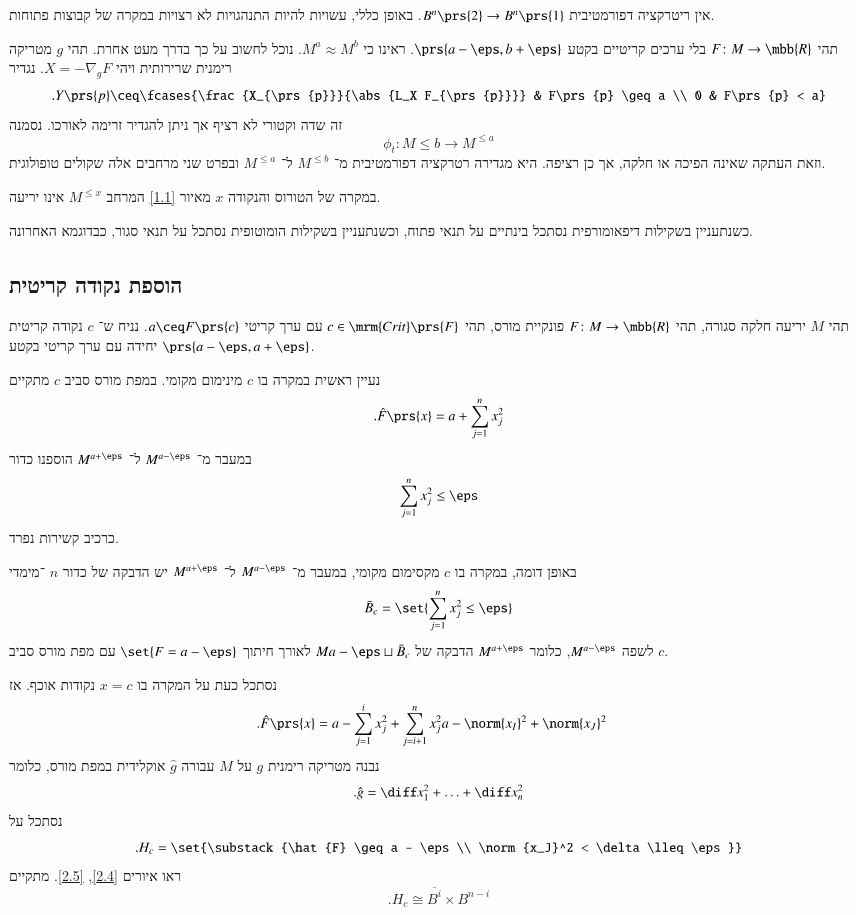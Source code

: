 \documentclass[a4paper,10pt,twoside,openany]{book}
\begin{document}
\begin{example}
אין ריטרקציה דפורמטיבית
$B^n\prs{2} \to B^n\prs{1}$.
באופן כללי, עשויות להיות התנהגויות לא רצויות במקרה של קבוצות פתוחות.
\end{example}

\begin{example}
תהי
$F \colon M \to \mbb{R}$
בלי ערכים קריטיים בקטע
$\prs{a-\eps, b+\eps}$.
ראינו כי
$M^a \approx M^b$.
נוכל לחשוב על כך בדרך מעט אחרת.
תהי
$g$
מטריקה רימנית שרירותית ויהי
$X = -\nabla_g F$.
נגדיר
\[\text{.} Y\prs{p} \ceq \fcases{\frac{X_{\prs{p}}}{\abs{L_X F_{\prs{p}}}} & F\prs{p} \geq a \\ 0 & F\prs{p} < a}\]
זה שדה וקטורי לא רציף אך ניתן להגדיר זרימה לאורכו.
נסמנה
\[\phi_t \colon M{\leq b} \to M^{\leq a}\]
וזאת העתקה שאינה הפיכה או חלקה, אך כן רציפה.
היא מגדירה רטרקציה דפורמטיבית מ־%
$M^{\leq b}$
ל־%
$M^{\leq a}$
ובפרט שני מרחבים אלה שקולים טופולוגית.
\end{example}

\begin{remark}
במקרה של הטורוס והנקודה
$x$
מאיור
\ref{1.1}
המרחב
$M^{\leq x}$
אינו יריעה.

כשנתעניין בשקילות דיפאומורפית נסתכל בינתיים על תנאי פתוח, וכשנתעניין בשקילות הומוטופית נסתכל על תנאי סגור, כבדוגמא האחרונה.
\end{remark}

\subsection{הוספת נקודה קריטית}

תהי
$M$
יריעה חלקה סגורה,
תהי
$F \colon M \to \mbb{R}$
פונקיית מורס, תהי
$c \in \mrm{Crit}\prs{F}$
עם ערך קריטי
$a \ceq F\prs{c}$.
נניח ש־%
$c$
נקודה קריטית יחידה עם ערך קריטי בקטע
$\prs{a-\eps,a+\eps}$.

נעיין ראשית במקרה בו
$c$
מינימום מקומי.
במפת מורס סביב
$c$
מתקיים
\[\text{.} \hat{F}\prs{x} = a + \sum_{j = 1}^n x_j^2\]
במעבר מ־%
$M^{a-\eps}$
ל־%
$M^{a+\eps}$
הוספנו כדור
\[\sum_{j = 1}^n x_j^2 \leq \eps\]
כרכיב קשירות נפרד.

באופן דומה, במקרה בו
$c$
מקסימום מקומי, במעבר מ־%
$M^{a-\eps}$
ל־%
$M^{a+\eps}$
יש הדבקה של כדור
$n$%
־מימדי
\[\bar{B}_c = \set{\sum_{j = 1}^n x_j^2 \leq \eps}\]
לשפה
$M^{a-\eps}$,
כלומר
$M^{a+\eps}$
הדבקה של
$M{a-\eps} \sqcup \bar{B}_c$
לאורך חיתוך
$\set{F = a - \eps}$
עם מפת מורס סביב
$c$.

נסתכל כעת על המקרה בו
$x = c$
נקודות אוכף. אז
\begin{align*}
\text{.} \hat{F}\prs{x} &= a - \sum_{j=1}^i x_j^2 + \sum_{j=i+1}^n x_j^2
a - \norm{x_I}^2 + \norm{x_J}^2
\end{align*}
נבנה מטריקה רימנית
$g$
על
$M$
עבורה
$\hat{g}$
אוקלידית במפת מורס, כלומר
\[\text{.} \hat{g} = \diff x_1^2 + \ldots + \diff x_n^2\]
נסתכל על
\[\text{.} H_c = \set{\substack{\hat{F} \geq a - \eps \\ \norm{x_J}^2 < \delta \lleq \eps}}\]
ראו איורים
\ref{2.4}, \ref{2.5}.
מתקיים
\[\text{.} H_c \cong \overline{B^i} \times B^{n-i}\]
\end{document}
